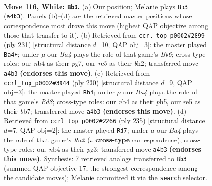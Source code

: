 \documentclass[11pt]{article}
\begin{document}
\clearpage

\begin{figure}[p]\centering
\begin{subfigure}{0.46\textwidth}\centering
\resizebox{\linewidth}{!}{%
\newchessgame
\chessboard[
  setfen={8/8/7k/4r1p1/Bn6/6K1/8/8 w - - 16 116},
  showmover=false,
  pgfstyle=straightmove, color=movearrow, markmove={a4-b3}
]}
\caption{}
\end{subfigure}\hfill
\begin{subfigure}{0.46\textwidth}\centering
\resizebox{\linewidth}{!}{%
\newchessgame
\chessboard[
  setfen={3k4/6P1/2KP4/8/8/1b6/7B/8 b - - 16 116},
  showmover=false,
  pgfstyle=straightmove, color=movearrow, markmove={b3-a4}
]}
\caption{}
\end{subfigure}
\\[4pt]
\begin{subfigure}{0.46\textwidth}\centering
\resizebox{\linewidth}{!}{%
\newchessgame
\chessboard[
  setfen={3B4/1b6/8/5k1p/5p2/8/5K2/8 w - - 78 116},
  showmover=false,
  pgfstyle=straightmove, color=movearrow, markmove={d8-h4}
]}
\caption{}
\end{subfigure}\hfill
\begin{subfigure}{0.46\textwidth}\centering
\resizebox{\linewidth}{!}{%
\newchessgame
\chessboard[
  setfen={6k1/r7/8/2R3PK/8/6P1/8/8 b - - 32 118},
  showmover=false,
  pgfstyle=straightmove, color=movearrow, markmove={a7-d7}
]}
\caption{}
\end{subfigure}
\caption{\textbf{Move 116, White: \texttt{Bb3}.} (a) Our position; Melanie plays \texttt{Bb3} (\texttt{a4b3}). Panels (b)--(d) are the retrieved master positions whose correspondence most drove this move (highest QAP objective among those that transfer to it). (b) Retrieved from \texttt{ccrl\_top\_p0002\#2899} (ply 231) [structural distance $d$=10, QAP obj=3]: the master played \texttt{Ba4+}; under $\mu$ our \emph{Ba4} plays the role of that game's \emph{Bb6}; cross-type roles: our \emph{n}b4 as their \emph{p}g7, our \emph{r}e5 as their \emph{b}h2; transferred move \texttt{a4b3} \textbf{(endorses this move)}. (c) Retrieved from \texttt{ccrl\_top\_p0002\#3944} (ply 230) [structural distance $d$=9, QAP obj=3]: the master played \texttt{Bh4}; under $\mu$ our \emph{Ba4} plays the role of that game's \emph{Bd8}; cross-type roles: our \emph{n}b4 as their \emph{p}h5, our \emph{r}e5 as their \emph{b}b7; transferred move \texttt{a4b3} \textbf{(endorses this move)}. (d) Retrieved from \texttt{ccrl\_top\_p0002\#2266} (ply 235) [structural distance $d$=7, QAP obj=2]: the master played \texttt{Rd7}; under $\mu$ our \emph{Ba4} plays the role of that game's \emph{Ra2} (a \textbf{cross-type} correspondence); cross-type roles: our \emph{n}b4 as their \emph{p}g3; transferred move \texttt{a4b3} \textbf{(endorses this move)}. Synthesis: 7 retrieved analogs transferred to \texttt{Bb3} (summed QAP objective 17, the strongest correspondence among the candidate moves); Melanie committed it via the \texttt{search} selector.}
\label{fig:thought-m230}
\end{figure}
\end{document}
